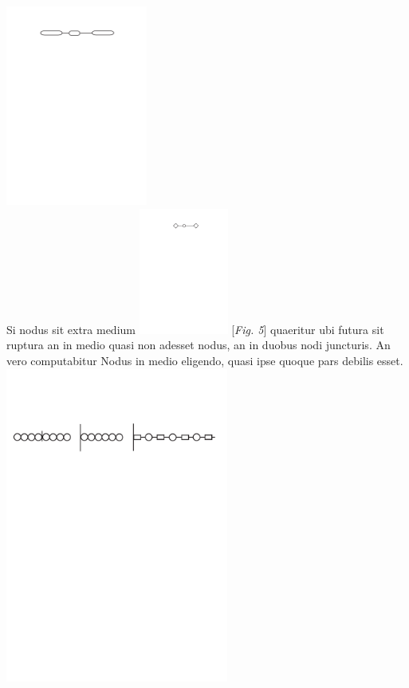 \pend
\vspace*{1.5em}
\pstart
\noindent
\centering
\includegraphics[trim = 0mm -3mm 0mm 0mm, clip, width=0.35\textwidth]{images/lh03705_208v-d4.pdf}\\
\pend
\vspace{1.5em}
\pstart%
Si nodus sit extra medium
\raisebox{-1,5ex}%
{\includegraphics[width=0.22\textwidth]{images/lh03705_208v-d5.pdf}} [\textit{Fig. 5}]
quaeritur ubi futura sit ruptura\protect{} an in medio quasi non adesset nodus, an in duobus nodi juncturis.
An vero computabitur Nodus in medio eligendo, quasi ipse quoque pars debilis esset.
\pend
\vspace{1.5em}%
\pstart%
\centering%
\noindent%
\includegraphics[width=0.55\textwidth]{images/lh03705_208v-d6u7u8.pdf}\\

